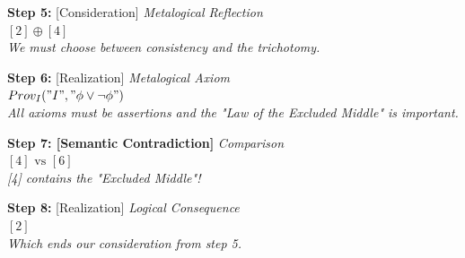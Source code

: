 \documentclass[runningheads]{llncs}
\begin{document}
\noindent\textbf{Step 5:} [Consideration] \hfill \textit{Metalogical Reflection}\\
\noindent$[2] \oplus [4]$\\
\textit{We must choose between consistency and the trichotomy.}

\vspace{1.5em}

\noindent\textbf{Step 6:} [Realization] \hfill \textit{Metalogical Axiom}\\
\noindent$Prov_I("I", "\phi \lor \neg\phi")$\\
\textit{All axioms must be assertions and the "Law of the Excluded Middle" is important.}

\vspace{1.5em}

\noindent\textbf{Step 7: [Semantic Contradiction]} \hfill \textit{Comparison}\\
\noindent$[4] \text{ vs } [6]$\\
\textit{[4] contains the "Excluded Middle"!}

\vspace{1.5em}

\noindent\textbf{Step 8:} [Realization] \hfill \textit{Logical Consequence}\\
\noindent$[2]$\\
\textit{Which ends our consideration from step 5.}
\end{document}
